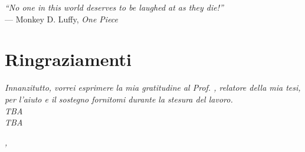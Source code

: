 \cleardoublepage
{}
{}

\begin{flushright}{
    \slshape
    ``No one in this world deserves to be laughed at as they die!''} \\
    \medskip
    --- Monkey D. Luffy, \textit{One Piece}
\end{flushright}


\bigskip

\begingroup
\let\clearpage\relax
\let\cleardoublepage\relax
\let\cleardoublepage\relax

\chapter*{Ringraziamenti}

\noindent \textit{Innanzitutto, vorrei esprimere la mia gratitudine al Prof. \myProf, relatore della mia tesi, per l'aiuto e il sostegno fornitomi durante la stesura del lavoro.}\\

\noindent \textit{TBA}\\

\noindent \textit{TBA}\\
\bigskip

\noindent\textit{\myLocation, \myTime}
\hfill \myName

\endgroup
